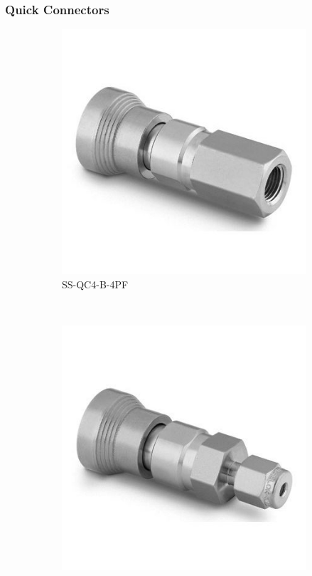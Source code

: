 \documentclass[a4paper,12pt,oneside]{article}
\begin{document}
\begin{appendices}
\subsubsection{Quick Connectors}
\begin{figure}[H]
    \centering
    \begin{subfigure}[b]{0.21\textwidth}
    \centering
    \includegraphics[width=\textwidth]{appendix/img/interfaces/SS-QC4-B-4PF.jpg}
    \caption{SS-QC4-B-4PF}
    \end{subfigure}
    ~
    \begin{subfigure}[b]{0.21\textwidth}
    \centering
    \includegraphics[width=\textwidth]{appendix/img/interfaces/SS-QC4-B-200.jpg}

\end{subfigure}
\end{figure}
\end{appendices}
\end{document}
